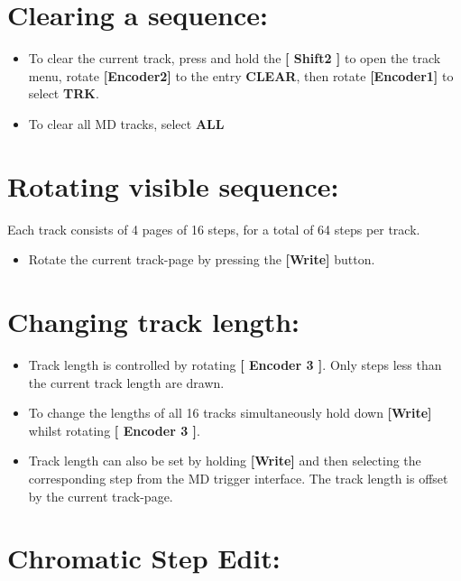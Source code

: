 \vspace{-0.3cm}

\section{Clearing a sequence:}
\begin{itemize}
\item To clear the current track, press and hold the\textbf{ [ Shift2 ]} to open the track menu, rotate \textbf{[Encoder2]} to the entry \textbf{CLEAR}, then rotate \textbf{[Encoder1]} to select \textbf{TRK}.
\item To clear all MD tracks, select \textbf{ALL}
\end{itemize}

\vspace{-0.3cm}

\section{Rotating visible sequence:}
Each track consists of 4 pages of 16 steps, for a total of 64 steps per track.
\begin{itemize}
\item Rotate the current track-page by pressing the \textbf{[Write] }button.
\end{itemize}

\vspace{-0.3cm}

\section{Changing track length:}
\begin{itemize}
\item Track length is controlled by rotating \textbf{[ Encoder 3 ]}. Only steps less than the current track length are drawn.
\item To change the lengths of all 16 tracks simultaneously hold down \textbf{[Write]} whilst rotating \textbf{[ Encoder 3 ]}.
\item Track length can also be set by holding \textbf{[Write]} and then selecting the corresponding step from the MD trigger interface. The track length is offset by the current track-page.
\end{itemize}

\vspace{-0.3cm}

\section{Chromatic Step Edit:}

